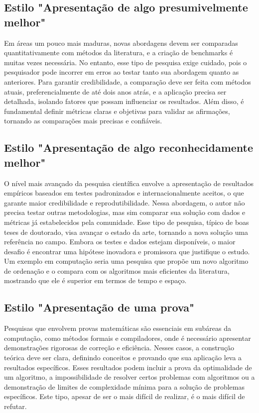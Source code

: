 \documentclass[
	12pt,				%
	openright,			%
	oneside,			%
	a4paper,			%
	chapter=TITLE,		%
	subsection=TITLE,	%
	english,			%
	brazilian,				%
	]{abntex2}
\begin{document}
\subsection*{Estilo "Apresentação de algo presumivelmente melhor"}
Em áreas um pouco mais maduras, novas abordagens devem ser comparadas quantitativamente com métodos da literatura, e a criação de benchmarks é muitas vezes necessária. No entanto, esse tipo de pesquisa exige cuidado, pois o pesquisador pode incorrer em erros ao testar tanto sua abordagem quanto as anteriores. Para garantir credibilidade, a comparação deve ser feita com métodos atuais, preferencialmente de até dois anos atrás, e a aplicação precisa ser detalhada, isolando fatores que possam influenciar os resultados. Além disso, é fundamental definir métricas claras e objetivas para validar as afirmações, tornando as comparações mais precisas e confiáveis.

\subsection*{Estilo "Apresentação de algo reconhecidamente melhor"}
O nível mais avançado da pesquisa científica envolve a apresentação de resultados empíricos baseados em testes padronizados e internacionalmente aceitos, o que garante maior credibilidade e reprodutibilidade. Nessa abordagem, o autor não precisa testar outras metodologias, mas sim comparar sua solução com dados e métricas já estabelecidos pela comunidade. Esse tipo de pesquisa, típico de boas teses de doutorado, visa avançar o estado da arte, tornando a nova solução uma referência no campo. Embora os testes e dados estejam disponíveis, o maior desafio é encontrar uma hipótese inovadora e promissora que justifique o estudo. Um exemplo em computação seria uma pesquisa que propõe um novo algoritmo de ordenação e o compara com os algoritmos mais eficientes da literatura, mostrando que ele é superior em termos de tempo e espaço.

\subsection*{Estilo "Apresentação de uma prova"}
Pesquisas que envolvem provas matemáticas são essenciais em subáreas da computação, como métodos formais e compiladores, onde é necessário apresentar demonstrações rigorosas de correção e eficiência. Nesses casos, a construção teórica deve ser clara, definindo conceitos e provando que sua aplicação leva a resultados específicos. Esses resultados podem incluir a prova da optimalidade de um algoritmo, a impossibilidade de resolver certos problemas com algoritmos ou a demonstração de limites de complexidade mínima para a solução de problemas específicos. Este tipo, apesar de ser o mais difícil de realizar, é o mais difícil de refutar.
\end{document}
